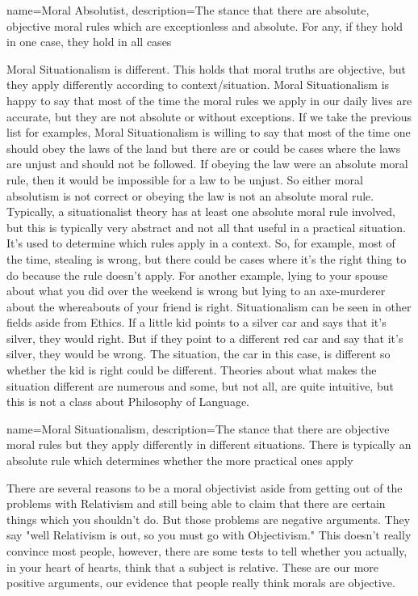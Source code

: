 {
  name=Moral Absolutist,
  description={The stance that there are absolute, objective moral rules which are exceptionless and absolute. For any, if they hold in one case, they hold in all cases}
}


Moral Situationalism is different. This holds that moral truths are objective, but they apply differently according to context/situation. \gls{Moral Situationalism} is happy to say that most of the time the moral rules we apply in our daily lives are accurate, but they are not absolute or without exceptions. If we take the previous list for examples, Moral Situationalism is willing to say that most of the time one should obey the laws of the land but there are or could be cases where the laws are unjust and should not be followed. If obeying the law were an absolute moral rule, then it would be impossible for a law to be unjust. So either moral absolutism is not correct or obeying the law is not an absolute moral rule. Typically, a situationalist theory has at least one absolute moral rule involved, but this is typically very abstract and not all that useful in a practical situation. It’s used to determine which rules apply in a context. So, for example, most of the time, stealing is wrong, but there could be cases where it’s the right thing to do because the rule doesn’t apply. For another example, lying to your spouse about what you did over the weekend is wrong but lying to an axe-murderer about the whereabouts of your friend is right. Situationalism can be seen in other fields aside from Ethics. If a little kid points to a silver car and says that it’s silver, they would right. But if they point to a different red car and say that it’s silver, they would be wrong. The situation, the car in this case, is different so whether the kid is right could be different. Theories about what makes the situation different are numerous and some, but not all, are quite intuitive, but this is not a class about Philosophy of Language.

{
  name=Moral Situationalism,
  description={The stance that there are objective moral rules but they apply differently in different situations. There is typically an absolute rule which determines whether the more practical ones apply}
}


There are several reasons to be a moral objectivist aside from getting out of the problems with Relativism and still being able to claim that there are certain things which you shouldn't do. But those problems are negative arguments. They say "well Relativism is out, so you must go with Objectivism." This doesn't really convince most people, however, there are some tests to tell whether you actually, in your heart of hearts, think that a subject is relative. These are our more positive arguments, our evidence that people really think morals are objective.

